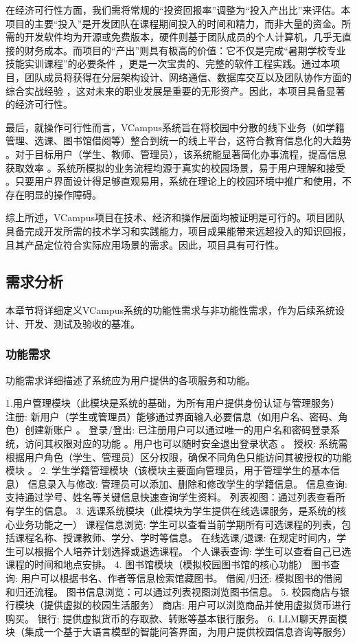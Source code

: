 \documentclass[a4paper]{ctexart}
\begin{document}
在经济可行性方面，我们需将常规的“投资回报率”调整为“投入产出比”来评估。本项目的主要“投入”是开发团队在课程期间投入的时间和精力，而非大量的资金。所需的开发软件均为开源或免费版本，硬件则基于团队成员的个人计算机，几乎无直接的财务成本。而项目的“产出”则具有极高的价值：它不仅是完成“暑期学校专业技能实训课程”的必要条件 ，更是一次宝贵的、完整的软件工程实践。通过本项目，团队成员将获得在分层架构设计、网络通信、数据库交互以及团队协作方面的综合实战经验 ，这对未来的职业发展是重要的无形资产。因此，本项目具备显著的经济可行性。

最后，就操作可行性而言，VCampus系统旨在将校园中分散的线下业务（如学籍管理、选课、图书馆借阅等）整合到统一的线上平台，这符合教育信息化的大趋势 。对于目标用户（学生、教师、管理员），该系统能显著简化办事流程，提高信息获取效率 。系统所模拟的业务流程均源于真实的校园场景，易于用户理解和接受 。只要用户界面设计得足够直观易用，系统在理论上的校园环境中推广和使用，不存在明显的操作障碍。

综上所述，VCampus项目在技术、经济和操作层面均被证明是可行的。项目团队具备完成开发所需的技术学习和实践能力，项目成果能带来远超投入的知识回报，且其产品定位符合实际应用场景的需求。因此，项目具有可行性。

\subsection{需求分析}

本章节将详细定义VCampus系统的功能性需求与非功能性需求，作为后续系统设计、开发、测试及验收的基准。

\subsubsection{功能需求}

功能需求详细描述了系统应为用户提供的各项服务和功能。

1.用户管理模块（此模块是系统的基础，为所有用户提供身份认证与管理服务）
注册: 新用户（学生或管理员）能够通过界面输入必要信息（如用户名、密码、角色）创建新账户 。
登录/登出: 已注册用户可以通过唯一的用户名和密码登录系统，访问其权限对应的功能 。用户也可以随时安全退出登录状态 。
授权: 系统需根据用户角色（学生、管理员）区分权限，确保不同角色只能访问其被授权的功能模块 。
2. 学生学籍管理模块（该模块主要面向管理员，用于管理学生的基本信息）
信息录入与修改: 管理员可以添加、删除和修改学生的学籍信息。
信息查询: 支持通过学号、姓名等关键信息快速查询学生资料。
列表视图：通过列表查看所有学生的信息。
3. 选课系统模块（此模块为学生提供在线选课服务，是系统的核心业务功能之一）
课程信息浏览: 学生可以查看当前学期所有可选课程的列表，包括课程名称、授课教师、学分、学时等信息。
在线选课/退课: 在规定时间内，学生可以根据个人培养计划选择或退选课程。
个人课表查询: 学生可以查看自己已选课程的时间和地点安排。
4. 图书馆模块（模拟校园图书馆的核心功能）
图书查询: 用户可以根据书名、作者等信息检索馆藏图书。
借阅/归还: 模拟图书的借阅和归还流程。
图书信息浏览：可以通过列表视图浏览图书信息。
5. 校园商店与银行模块（提供虚拟的校园生活服务）
商店: 用户可以浏览商品并使用虚拟货币进行购买。
银行: 提供虚拟货币的存取款、转账等基本银行服务。
6. LLM聊天界面模块（集成一个基于大语言模型的智能问答界面，为用户提供校园信息咨询等服务）
\end{document}
